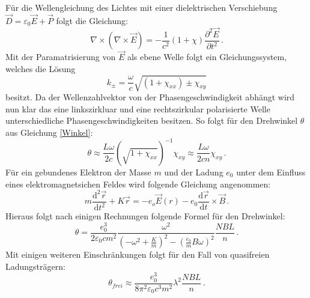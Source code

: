 Für die Wellengleichung des Lichtes mit einer dielektrischen Verschiebung $\vec{D}=\varepsilon_0 \vec{E} + \vec{P}$ folgt die Gleichung:
\begin{equation*}
	\nabla \times (\nabla \times \vec{E}) = -\frac{1}{c^2}(1+\chi)\frac{\partial^2\vec{E}}{\partial t^2} \, \mathrm{.}
\end{equation*}
Mit der Paramatrisierung von $\vec{E}$ als ebene Welle folgt ein Gleichungssystem, welches die
Lösung
\begin{equation*}
	k_{\pm} = \frac{\omega}{c}\sqrt{(1+\chi_{xx}) \pm \chi_{xy}}
\end{equation*}
besitzt. Da der Wellenzahlvektor von der Phasengeschwindigkeit abhängt wird nun klar das eine linkszirkluar und eine rechtszirkular polarisierte Welle unterschiedliche Phasengeschwindigkeiten besitzen. So folgt für den Drehwinkel $\theta$ aus Gleichung \eqref{Winkel}:
\begin{equation*}
	\theta \approx \frac{L\omega}{2c}(\sqrt{1+\chi_{xx}})^{-1}\chi_{xy} \approx \frac{L\omega}{2cn}\chi_{xy} \, \mathrm{.}
\end{equation*}
Für ein gebundenes Elektron der Masse $m$ und der Ladung $e_0$ unter dem Einfluss eines elektromagnetsichen Feldes wird folgende Gleichung angenommen:
\begin{equation*}
	m\frac{\mathrm{d}^2\vec{r}}{\mathrm{d}t^2}+K\vec{r} = - e_o \vec{E}(r) -e_0 \frac{\mathrm{d}\vec{r}}{\mathrm{d}t}\times \vec{B} \, \mathrm{.}
\end{equation*}
Hieraus folgt nach einigen Rechnungen folgende Formel für den Drehwinkel:
\begin{equation*}
	\theta = \frac{e_0^3}{2 \varepsilon_0 c m^2} \frac{\omega^2}{\left(-\omega^2+\frac{K}{m}
	\right)^2-\left(\frac{e_0}{m}B\omega\right)^2}\frac{NBL}{n} \, \mathrm{.}
\end{equation*}
Mit einigen weiteren Einschränkungen folgt für den Fall von quasifreien Ladungsträgern:
\begin{equation}\label{Masse}
	\theta_{frei}\approx\frac{e_0^3}{8 \pi^2 \varepsilon_0 c^3 m^2}\lambda^2\frac{NBL}{n} \, \mathrm{.}
\end{equation}
